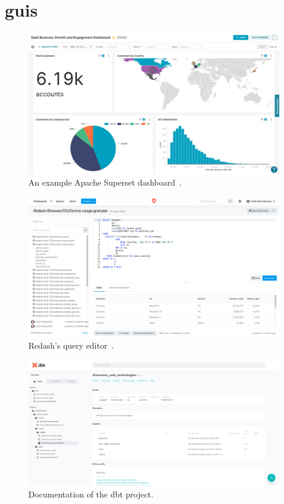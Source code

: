 \section{\acp{gui}}
\label{sec:appendix-guis}

\begin{figure}[H]
    \centering
    \includegraphics[width=0.9\textheight, angle=90]{figures/superset-dashboard.jpg}
    \caption{An example Apache Superset dashboard~\cite{ASF2024a}.}
    \label{fig:superset-dashboard}
\end{figure}

\begin{figure}[H]
    \centering
    \includegraphics[width=0.9\textheight, angle=90]{figures/redash-query-editor.png}
    \caption{Redash's query editor~\cite{RedashCommunity2024}.}
    \label{fig:redash-query-editor}
\end{figure}

\begin{figure}[H]
    \centering
    \includegraphics[width=0.9\textheight, angle=90]{figures/dbt-docs.png}
    \caption{Documentation of the dbt project.}
    \label{fig:appendix-guis-dbt-docs}
\end{figure}

